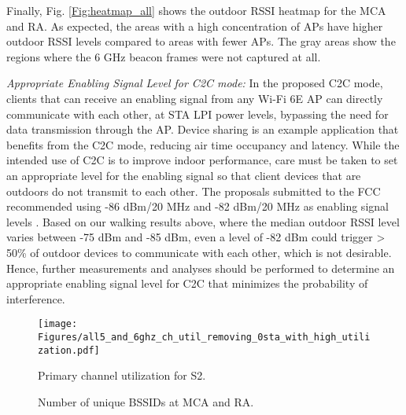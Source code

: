 \documentclass[sigconf,10pt]{acmart}
\begin{document}
Finally, Fig. \ref{Fig:heatmap_all} shows the outdoor RSSI heatmap for the MCA and RA. As expected, the areas with a high concentration of APs have higher outdoor RSSI levels compared to areas with fewer APs. The gray areas show the regions where the 6 GHz beacon frames were not captured at all.

{\it Appropriate Enabling Signal Level for C2C mode:} In the proposed C2C mode, clients that can receive an enabling signal from any Wi-Fi 6E AP can directly communicate with each other, at  STA LPI power levels,  bypassing the need for data transmission through the AP. Device sharing is an example application that benefits from the C2C mode, reducing air time occupancy and latency. While the intended use of C2C is to improve indoor performance, care must be taken to set an appropriate level for the enabling signal so that client devices that are outdoors do not transmit to each other. The proposals submitted to the FCC recommended using -86 dBm/20 MHz and -82 dBm/20 MHz as enabling signal levels \cite{Intel}. Based on our walking results above, where the median outdoor RSSI level varies between -75 dBm and -85 dBm, even a level of -82 dBm could trigger > 50\% of outdoor devices to communicate with each other, which is not desirable. Hence, further measurements and analyses should be performed to determine an appropriate enabling signal level for C2C that minimizes the probability of interference.

\begin{figure}
     \centering
    \texttt{[image: Figures/all5\_and\_6ghz\_ch\_util\_removing\_0sta\_with\_high\_utilization.pdf]} \vspace{-1em}
    \caption{Primary channel utilization for S2.}
    \label{Fig:meas_chutil}
     \vspace{-1.5em}
\end{figure}

\begin{figure}
     \centering
     \begin{subfigure}[Main campus area (MCA).]{  
     \centering
    \texttt{[image: Figures/Barchart\_fig\_walking\_campus2.pdf]}
         \label{Fig:bssidcampus}}
    \end{subfigure} \hspace{-7mm}
     \begin{subfigure}[Residential area (RA).]{
         \centering
         \texttt{[image: Figures/Barchart\_DW\_northwood2.pdf]}
        \label{Fig:bssidnw}}
     \end{subfigure} \vspace{-1em}
    \caption{Number of unique BSSIDs at MCA and RA. }
    \label{Fig:meas_locs1}
    \vspace{-1.5em}
\end{figure}
\end{document}
